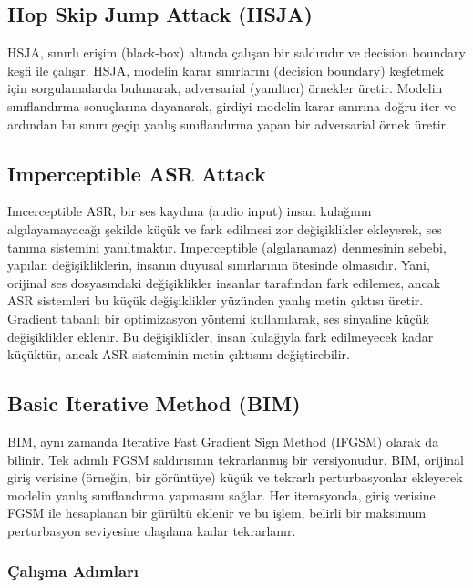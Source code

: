 \newpage

\subsection{Hop Skip Jump Attack (HSJA)}

HSJA, sınırlı erişim (black-box) altında çalışan bir saldırıdır ve decision boundary keşfi ile çalışır. HSJA, modelin karar sınırlarını (decision boundary) keşfetmek için sorgulamalarda bulunarak, adversarial (yanıltıcı) örnekler üretir. Modelin sınıflandırma sonuçlarına dayanarak, girdiyi modelin karar sınırına doğru iter ve ardından bu sınırı geçip yanlış sınıflandırma yapan bir adversarial örnek üretir.

\newpage

\subsection{Imperceptible ASR Attack}

Imcerceptible ASR, bir ses kaydına (audio input) insan kulağının algılayamayacağı şekilde küçük ve fark edilmesi zor değişiklikler ekleyerek, ses tanıma sistemini yanıltmaktır. Imperceptible (algılanamaz) denmesinin sebebi, yapılan değişikliklerin, insanın duyusal sınırlarının ötesinde olmasıdır. Yani, orijinal ses dosyasındaki değişiklikler insanlar tarafından fark edilemez, ancak ASR sistemleri bu küçük değişiklikler yüzünden yanlış metin çıktısı üretir. Gradient tabanlı bir optimizasyon yöntemi kullanılarak, ses sinyaline küçük değişiklikler eklenir. Bu değişiklikler, insan kulağıyla fark edilmeyecek kadar küçüktür, ancak ASR sisteminin metin çıktısını değiştirebilir.

\newpage

\subsection{Basic Iterative Method (BIM)}

BIM, aynı zamanda Iterative Fast Gradient Sign Method (IFGSM) olarak da bilinir. Tek adımlı FGSM saldırısının tekrarlanmış bir versiyonudur. BIM, orijinal giriş verisine (örneğin, bir görüntüye) küçük ve tekrarlı perturbasyonlar ekleyerek modelin yanlış sınıflandırma yapmasını sağlar. Her iterasyonda, giriş verisine FGSM ile hesaplanan bir gürültü eklenir ve bu işlem, belirli bir maksimum perturbasyon seviyesine ulaşılana kadar tekrarlanır.

\subsubsection{Çalışma Adımları}

